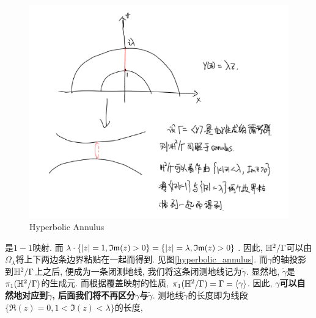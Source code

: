 \begin{figure}[!h]
    \centering
    \includegraphics[scale=0.4]{images/hyperbolic_annulus.png}
    \caption{Hyperbolic Annulus}
    \label{hyperbolic_annulus}
\end{figure}

是$1-1$映射.  而$\lambda \cdot \{{\left | z \right |}=1, {\mathfrak{Im}}(z)>0\}= \{{\left | z \right |}=\lambda, {\mathfrak{Im}}(z)>0\}$. 因此, ${\mathbb{H}^2}/\Gamma$可以由$\Omega_\lambda$将上下两边条边界粘贴在一起而得到. 见图\eqref{hyperbolic_annulus}. 而$\gamma$的轴投影到${\mathbb{H}^2}/\Gamma$上之后, 便成为一条闭测地线, 我们将这条闭测地线记为$\tilde{\gamma}$. 显然地, $\tilde{\gamma}$是$\pi_1({\mathbb{H}^2}/\Gamma)$的生成元. 而根据覆盖映射的性质, $\pi_1({\mathbb{H}^2}/\Gamma) = \Gamma= \left< \gamma \right>$.  因此, \textbf{$\gamma$可以自然地对应到$\tilde{\gamma}$, 后面我们将不再区分$\gamma$与$\tilde{\gamma}$}. 测地线$\tilde{\gamma}$的长度即为线段$\{\Re(z)=0, 1<\Im(z)< \lambda\}$的长度,

